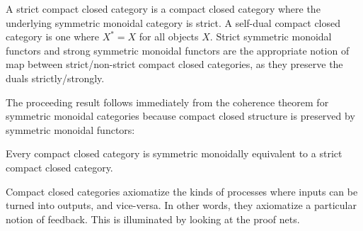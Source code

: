 \begin{definition}
\begin{description}
\hspace*{-1.15cm}
\end{description}
A strict compact closed category is a compact closed category where the underlying symmetric monoidal category is strict.
A self-dual compact closed category is one where $X^*=X$ for all objects $X$.
Strict symmetric monoidal functors and strong symmetric monoidal functors are the appropriate notion of map between strict/non-strict compact closed categories, as they preserve the duals strictly/strongly.
\end{definition}
The proceeding result follows immediately from the coherence theorem for symmetric monoidal categories because compact closed structure is preserved by symmetric monoidal functors:
\begin{theorem}
Every compact closed category is  symmetric monoidally equivalent to a strict compact closed category. 
\end{theorem}
Compact closed categories axiomatize the kinds of processes where inputs can be turned into outputs, and vice-versa.  In other words, they axiomatize a particular notion of feedback.  This is illuminated by looking at the proof nets.
